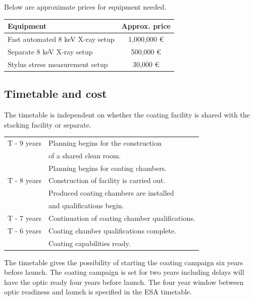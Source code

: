 Below are approximate prices for equipment needed.

\begin{table}[htbp]
	\centering
\begin{tabular}{l|c}
Equipment & Approx. price\\
\hline
\hline
Fast automated 8 keV X-ray setup  & 1,000,000 \euro\\
\hline
Separate 8 keV X-ray setup & 500,000 \euro\\
\hline
Stylus stress measurement setup & 30,000 \euro\\
\end{tabular}
\end{table}



\subsection{Timetable and cost}

The timetable is independent on whether the coating facility is shared with the stacking facility or separate.\\

\begin{table}[htbp]
	\centering
\begin{tabular}{c|l}
T - 9 years & Planning begins for the construction\\
  & \hspace{1cm} of a shared clean room. \\
			& Planning begins for coating chambers.\\
\hline
T - 8 years & Construction of facility is carried out.\\
			& Produced coating chambers are installed\\
      & \hspace{1cm} and qualifications begin.\\
\hline
T - 7 years & Continuation of coating chamber qualifications.\\
\hline
T - 6 years & Coating chamber qualifications complete.\\
			& Coating capabilities ready.\\

\end{tabular}
\end{table}

The timetable gives the possibility of starting the coating campaign six years before launch. The coating campaign is set for two years including delays will have the optic ready four years before launch. The four year window between optic readiness and launch is specified in the ESA timetable.

